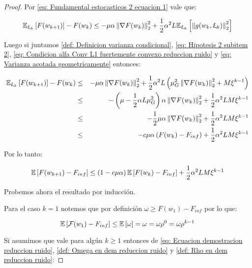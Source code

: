 \begin{proof}
	Por \ref{eq: Fundamental estocasticos 2 ecuacion 1} vale que:
	
	\begin{equation*}
		\mathbb{E}_{\upxi_{k}} \left[F(w_{k+1})\right] - F(w_k) \leq  -\mu \alpha \left\lVert\nabla F(w_k)\right\rVert_2^2 + \frac{1}{2} \alpha^2 L \mathbb{E}_{\upxi_{k}} \left[\left\lVert g(w_k, \upxi_{k})\right\rVert_2^2\right]
	\end{equation*}
	
	Luego si juntamos \ref{def: Definicion varianza condicional}, \ref{eq: Hipotesis 2 subitem 2}, \ref{eq: Condicion alfa Conv L1 fuertemente convexo reduccion ruido} y \ref{eq: Varianza acotada geometricamente} entonces:
	
	\begin{equation*}
	\begin{aligned}
		\mathbb{E}_{\upxi_{k}} \left[F(w_{k+1})\right] - F(w_k) & \leq & -\mu \alpha \left\lVert\nabla F(w_k)\right\rVert_2^2 + \frac{1}{2} \alpha^2 L \left(\mu_G^2  \left\lVert\nabla F(w_k)\right\rVert_2^2 + M \xi^{k-1}\right) \\
		& \leq & - \left(\mu - \frac{1}{2}\alpha L \mu_G^2 \right) \alpha \left\lVert\nabla F(w_k)\right\rVert_2^2 + \frac{1}{2} \alpha^2 LM \xi^{k-1} \\
		& \leq & -\frac{1}{2}\mu \alpha \left\lVert\nabla F(w_k)\right\rVert_2^2 + \frac{1}{2} \alpha^2 LM \xi^{k-1} \\
		& \leq &  -c \mu \alpha \left( F(w_k) - F_{inf} \right) + \frac{1}{2} \alpha^2 LM \xi^{k-1}
	\end{aligned}
	\end{equation*}
	
	Por lo tanto:
	
	\begin{equation}
		\label{eq: Ecuacion demostracion reduccion ruido}
		\mathbb{E} \left[F(w_{k+1}) - F_{inf}\right] \leq \left(1 - c \mu \alpha\right) \mathbb{E} \left[F(w_k) - F_{inf}\right] + \frac{1}{2} \alpha^2 LM \xi^{k-1}
	\end{equation}
	
	Probemos ahora el resultado por inducci\'on. 
	
	Para el caso $k=1$ notemos que por definici\'on $\omega \geq F(w_1) - F_{inf}$ por lo que:
	
	\begin{equation*}
		\mathbb{E} \left[\mathcal{F}(w_1) - F_{inf}\right] \leq \mathbb{E} \left[\omega\right] = \omega = \omega \rho^{0} = \omega \rho^{k-1}
	\end{equation*}
	
	Si asumimos que vale para alg\'un $k \geq 1$ entonces de \ref{eq: Ecuacion demostracion reduccion ruido}, \ref{def: Omega en dem reduccion ruido} y \ref{def: Rho en dem reduccion ruido}:
	

\end{proof}
